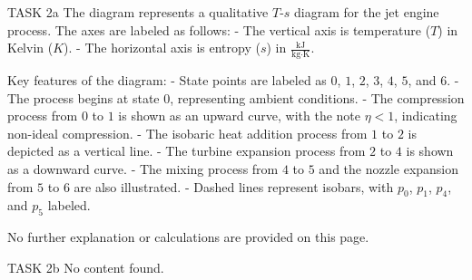 TASK 2a  
The diagram represents a qualitative \( T \)-\( s \) diagram for the jet engine process. The axes are labeled as follows:  
- The vertical axis is temperature (\( T \)) in Kelvin (\( K \)).  
- The horizontal axis is entropy (\( s \)) in \( \frac{\text{kJ}}{\text{kg·K}} \).  

Key features of the diagram:  
- State points are labeled as \( 0 \), \( 1 \), \( 2 \), \( 3 \), \( 4 \), \( 5 \), and \( 6 \).  
- The process begins at state \( 0 \), representing ambient conditions.  
- The compression process from \( 0 \) to \( 1 \) is shown as an upward curve, with the note \( \eta < 1 \), indicating non-ideal compression.  
- The isobaric heat addition process from \( 1 \) to \( 2 \) is depicted as a vertical line.  
- The turbine expansion process from \( 2 \) to \( 4 \) is shown as a downward curve.  
- The mixing process from \( 4 \) to \( 5 \) and the nozzle expansion from \( 5 \) to \( 6 \) are also illustrated.  
- Dashed lines represent isobars, with \( p_0 \), \( p_1 \), \( p_4 \), and \( p_5 \) labeled.  

No further explanation or calculations are provided on this page.  

TASK 2b  
No content found.